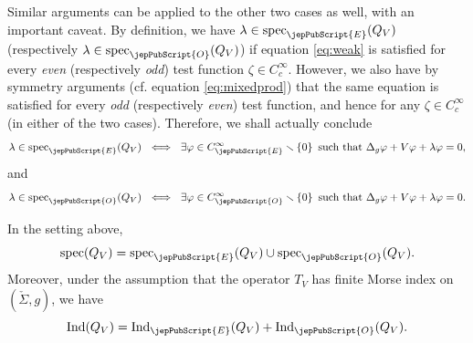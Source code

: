         	Similar arguments can be applied to the other two cases as well, with an important caveat. By definition, we have $\lambda\in \operatorname{spec}_{{\jepPubScript{E}}} (Q_V)$ (respectively $\lambda\in \operatorname{spec}_{{\jepPubScript{O}}} (Q_V)$) if equation \eqref{eq:weak} is satisfied for every \textsl{even} (respectively \textsl{odd}) test function $\zeta\in C^{\infty}_c$. However, we also have by symmetry arguments (cf. equation \eqref{eq:mixedprod}) that the same equation is satisfied for every \textsl{odd} (respectively \textsl{even}) test function, and hence for any $\zeta\in C^{\infty}_c$ (in either of the two cases). Therefore, we shall actually conclude
        	\[
        	\lambda\in \operatorname{spec}_{{\jepPubScript{E}}} (Q_V) \ \iff \ \exists \varphi\in  C^{\infty}_{{\jepPubScript{E}}}\smallsetminus \left\{0\right\} \ \text{such that} \	\Delta_g \varphi+V\varphi+\lambda\varphi=0,
        	\]
        	and
        	\[
        	\lambda\in \operatorname{spec}_{{\jepPubScript{O}}} (Q_V) \ \iff \ \exists \varphi\in  C^{\infty}_{{\jepPubScript{O}}}\smallsetminus \left\{0\right\} \ \text{such that} \	\Delta_g \varphi+V\varphi+\lambda\varphi=0.
        	\]
        	
        	
        	
        	
        	\begin{lem}\label{lem:specadd}
        		In the setting above,
        		\[
        		\operatorname{spec} (Q_V)=\operatorname{spec}_{{\jepPubScript{E}}} (Q_V) \cup 	\operatorname{spec}_{{\jepPubScript{O}}} (Q_V).
        		\]
        		Moreover, under the assumption that the operator $T_V$ has finite Morse index on $(\check{\Sigma},g)$, we have
        		\[
        		\operatorname{Ind} (Q_V) = \operatorname{Ind}_{{\jepPubScript{E}}} (Q_V)+\operatorname{Ind}_{{\jepPubScript{O}}} (Q_V).
        		\]
        	\end{lem}
        	
        		
        	

